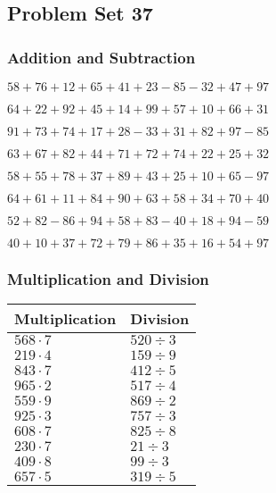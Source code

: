 \hypertarget{problem-set-37}{%
\subsection{Problem Set 37}\label{problem-set-37}}

\hypertarget{addition-and-subtraction}{%
\subsubsection{Addition and
Subtraction}\label{addition-and-subtraction}}

\(58+76+12+65+41+23-85-32+47+97\)

\(64+22+92+45+14+99+57+10+66+31\)

\(91+73+74+17+28-33+31+82+97-85\)

\(63+67+82+44+71+72+74+22+25+32\)

\(58+55+78+37+89+43+25+10+65-97\)

\(64+61+11+84+90+63+58+34+70+40\)

\(52+82-86+94+58+83-40+18+94-59\)

\(40+10+37+72+79+86+35+16+54+97\)

\hypertarget{multiplication-and-division}{%
\subsubsection{Multiplication and
Division}\label{multiplication-and-division}}

\begin{longtable}[]{@{}ll@{}}
\toprule
Multiplication & Division\tabularnewline
\midrule
\endhead
\(568\cdot7\) & \(520÷3\)\tabularnewline
\(219\cdot4\) & \(159÷9\)\tabularnewline
\(843\cdot7\) & \(412÷5\)\tabularnewline
\(965\cdot2\) & \(517÷4\)\tabularnewline
\(559\cdot9\) & \(869÷2\)\tabularnewline
\(925\cdot3\) & \(757÷3\)\tabularnewline
\(608\cdot7\) & \(825÷8\)\tabularnewline
\(230\cdot7\) & \(21÷3\)\tabularnewline
\(409\cdot8\) & \(99÷3\)\tabularnewline
\(657\cdot5\) & \(319÷5\)\tabularnewline
\bottomrule
\end{longtable}
